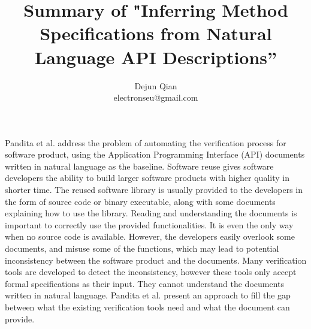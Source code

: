 \documentclass[11pt,letterpaper,oneside]{article}
\title{Summary of "Inferring Method Specifications from Natural Language API Descriptions''}
\author{Dejun Qian\\electronseu@gmail.com}
\date{}
\begin{document}
\maketitle

Pandita et al. \cite{bib:Pandita} address the problem of automating the verification process for software product, 
using the Application Programming Interface (API) documents written in natural language as the baseline.
Software reuse gives software developers the ability to build larger software products with higher quality in shorter time.
The reused software library is usually provided to the developers in the form of source code or binary executable,
along with some documents explaining how to use the library.
Reading and understanding the documents is important to correctly use the provided functionalities.
It is even the only way when no source code is available.
However, the developers easily overlook some documents,
and misuse some of the functions,
which may lead to potential inconsistency between the software product and the documents.
Many verification tools are developed to detect the inconsistency,
however these tools only accept formal specifications as their input.
They cannot understand the documents written in natural language.
Pandita et al. \cite{bib:Pandita} present an approach to fill the gap between what the existing verification tools need and what the document can provide.
\end{document}
